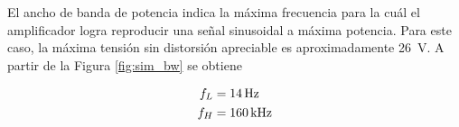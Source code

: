 

El ancho de banda de potencia indica la máxima frecuencia para la cuál el amplificador logra reproducir una señal sinusoidal a máxima potencia. Para este caso, la máxima tensión sin distorsión apreciable es aproximadamente \SI{26}{\volt}. A partir de la Figura \ref{fig:sim_bw} se obtiene

\begin{align}
	\centering
	f_L &= \SI{14}{\hertz} \\
	f_H &= \SI{160}{\kilo\hertz}
\end{align}
